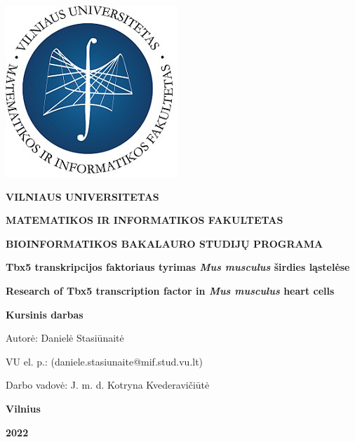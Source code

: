 \documentclass[12pt]{article}
\begin{document}

\begin{titlepage}
\vskip 20pt
\begin{center}
\includegraphics[scale=0.5]{MIF}
\end{center}


\vskip 20pt
\centerline{\bf \large \textbf{VILNIAUS UNIVERSITETAS}}
\bigskip
\centerline{\large \textbf{MATEMATIKOS IR INFORMATIKOS FAKULTETAS}}
\bigskip
\centerline{\large \textbf{BIOINFORMATIKOS BAKALAURO STUDIJŲ PROGRAMA}}

\vskip 90pt
\begin{center}
    {\bf \LARGE Tbx5 transkripcijos faktoriaus tyrimas \emph{Mus musculus}
     širdies ląstelėse}
\end{center}
\begin{center}
    {\bf \Large Research of Tbx5 transcription factor in \emph{Mus musculus}
     heart cells}
\end{center}
\vskip 20pt
\centerline{\bf \large \textbf{Kursinis darbas}}
\bigskip
\vskip 40pt

\hskip 140pt {\large Autorė: Danielė Stasiūnaitė}

\hskip 140pt{\large VU el. p.: (daniele.stasiunaite@mif.stud.vu.lt)}
\bigskip
\vskip 20pt

\hskip 140pt {\large Darbo vadovė: J. m. d. Kotryna Kvederavičiūtė}
\vskip 60pt
\vskip 40pt
\centerline{\large \textbf{Vilnius}}
\centerline{\large \textbf{2022}}
\newpage
\end{titlepage}


\tableofcontents
\newpage

\end{document}
